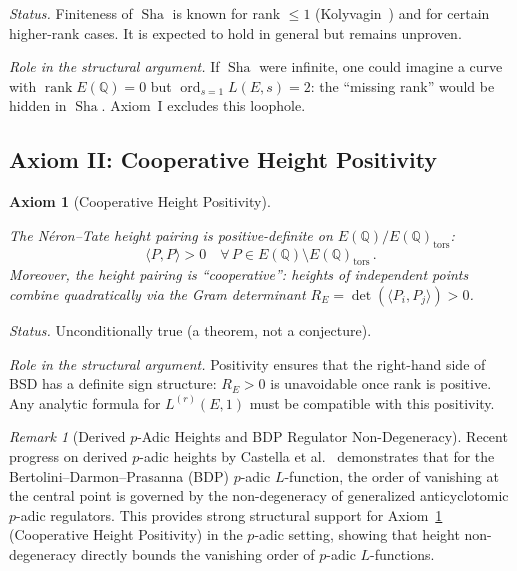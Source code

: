 \documentclass[aps,prd,twocolumn,superscriptaddress,nofootinbib,floatfix]{revtex4-2}
\newtheorem{axiom}[theorem]{Axiom}
\theoremstyle{definition}
\theoremstyle{remark}
\newtheorem{remark}[theorem]{Remark}
\DeclareMathOperator{\ord}{ord}
\DeclareMathOperator{\rank}{rank}
\DeclareMathOperator{\Sha}{Sha}
\begin{document}
\textit{Status.} Finiteness of $\Sha$ is known for rank $\leq 1$ (Kolyvagin~\cite{Kolyvagin1990}) and for certain higher-rank cases. It is expected to hold in general but remains unproven.

\textit{Role in the structural argument.} If $\Sha$ were infinite, one could imagine a curve with $\rank E(\mathbb{Q}) = 0$ but $\ord_{s=1} L(E,s) = 2$: the ``missing rank'' would be hidden in $\Sha$. Axiom~I excludes this loophole.

\subsection{Axiom II: Cooperative Height Positivity}

\begin{axiom}[Cooperative Height Positivity]
\label{ax:positivity}
\mbox{}\par\noindent The Néron--Tate height pairing is positive-definite on $E(\mathbb{Q})/E(\mathbb{Q})_{\mathrm{tors}}$:
\begin{equation}
\langle P, P \rangle > 0 \quad \forall\, P \in E(\mathbb{Q}) \setminus E(\mathbb{Q})_{\mathrm{tors}}\,.
\end{equation}
Moreover, the height pairing is ``cooperative'': heights of independent points combine quadratically via the Gram determinant $R_E = \det(\langle P_i, P_j \rangle) > 0$.
\end{axiom}

\textit{Status.} Unconditionally true (a theorem, not a conjecture).

\textit{Role in the structural argument.} Positivity ensures that the right-hand side of BSD has a definite sign structure: $R_E > 0$ is unavoidable once rank is positive. Any analytic formula for $L^{(r)}(E,1)$ must be compatible with this positivity.

\begin{remark}[Derived $p$-Adic Heights and BDP Regulator Non-Degeneracy]
\label{rem:castella-bdp}
Recent progress on derived $p$-adic heights by Castella et al.~\cite{Castella2025} demonstrates that for the Bertolini--Darmon--Prasanna (BDP) $p$-adic $L$-function, the order of vanishing at the central point is governed by the non-degeneracy of generalized anticyclotomic $p$-adic regulators. This provides strong structural support for Axiom~\ref{ax:positivity} (Cooperative Height Positivity) in the $p$-adic setting, showing that height non-degeneracy directly bounds the vanishing order of $p$-adic $L$-functions.
\end{remark}
\end{document}
